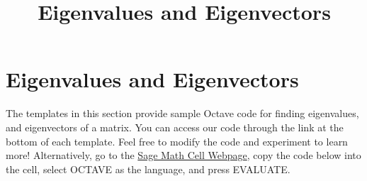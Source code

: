 \documentclass{ximera}
\title{Eigenvalues and Eigenvectors} \license{CC BY-NC-SA 4.0}
\begin{document}
\begin{abstract}
\end{abstract}
\maketitle
\section*{Eigenvalues and Eigenvectors}

The templates in this section provide sample Octave code for finding eigenvalues, and eigenvectors of a matrix.  You can access our code through the link at the bottom of each template.  Feel free to modify the code and experiment to learn more!  Alternatively, go to the \href{https://sagecell.sagemath.org/}{Sage Math Cell Webpage}, copy the code below into the cell, select OCTAVE as the language, and press EVALUATE.  
\end{document}
